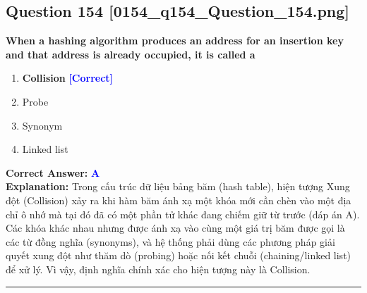 \documentclass[11pt,a4paper]{article}
\begin{document}
\begin{minipage}{\textwidth}
\subsection*{Question 154 \quad \footnotesize{[0154\_q154\_Question\_154.png]}}
\noindent \textbf{When a hashing algorithm produces an address for an insertion key and that address is already occupied, it is called a}

\begin{enumerate}[label=\Alph*.]
    \item \textbf{Collision} \hfill \textcolor{blue}{\textbf{[Correct]}}
    \item Probe
    \item Synonym
    \item Linked list
\end{enumerate}

\noindent \textbf{Correct Answer:} \textcolor{blue}{\textbf{A}} \\[2pt]
\noindent \textbf{Explanation:} Trong cấu trúc dữ liệu bảng băm (hash table), hiện tượng Xung đột (Collision) xảy ra khi hàm băm ánh xạ một khóa mới cần chèn vào một địa chỉ ô nhớ mà tại đó đã có một phần tử khác đang chiếm giữ từ trước (đáp án A). Các khóa khác nhau nhưng được ánh xạ vào cùng một giá trị băm được gọi là các từ đồng nghĩa (synonyms), và hệ thống phải dùng các phương pháp giải quyết xung đột như thăm dò (probing) hoặc nối kết chuỗi (chaining/linked list) để xử lý. Vì vậy, định nghĩa chính xác cho hiện tượng này là Collision.

\par\vspace{0.3cm}
\hrule
\vspace{0.3cm}
\end{minipage}
\end{document}
